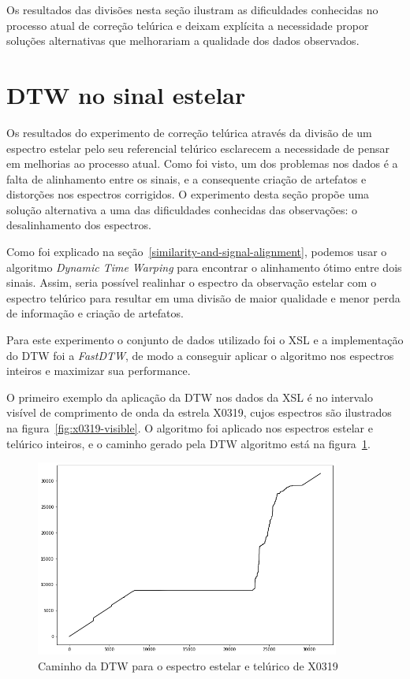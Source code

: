 Os resultados das divisões nesta seção ilustram as dificuldades conhecidas no processo atual de correção telúrica e deixam explícita a necessidade propor soluções alternativas que melhorariam a qualidade dos dados observados.

\section{DTW no sinal estelar}

Os resultados do experimento de correção telúrica através da divisão de um espectro estelar pelo seu referencial telúrico esclarecem a necessidade de pensar em melhorias ao processo atual. Como foi visto, um dos problemas nos dados é a falta de alinhamento entre os sinais, e a consequente criação de artefatos e distorções nos espectros corrigidos. O experimento desta seção propõe uma solução alternativa a uma das dificuldades conhecidas das observações: o desalinhamento dos espectros.


Como foi explicado na seção~\ref{similarity-and-signal-alignment}, podemos usar o algoritmo \textit{Dynamic Time Warping} para encontrar o alinhamento ótimo entre dois sinais. Assim, seria possível realinhar o espectro da observação estelar com o espectro telúrico para resultar em uma divisão de maior qualidade e menor perda de informação e criação de artefatos. 

Para este experimento o conjunto de dados utilizado foi o XSL e a implementação do DTW foi a \textit{FastDTW}, de modo a conseguir aplicar o algoritmo nos espectros inteiros e maximizar sua performance.

O primeiro exemplo da aplicação da DTW nos dados da XSL é no intervalo visível de comprimento de onda da estrela X0319, cujos espectros são ilustrados na figura~\ref{fig:x0319-visible}. O algoritmo foi aplicado nos espectros estelar e telúrico inteiros, e o caminho gerado pela DTW algoritmo está na figura~\ref{fig:x0319-warp-path}.

\begin{figure}[htb]
\centering
\includegraphics[width=10cm]{figuras/x0319_warp_path.png}
\caption{Caminho da DTW para o espectro estelar e telúrico de X0319}
\label{fig:x0319-warp-path}
\end{figure}

